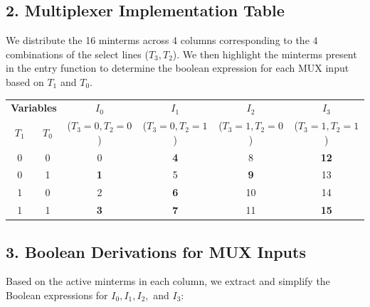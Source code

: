 \documentclass[12pt,a3paper]{article}
\begin{document}
\begin{enumerate}
\begin{tcolorbox}[enhanced,breakable,ansbox,colback=cD!4,colframe=cD,boxrule=0.8pt,arc=5pt,title={\textbf{Answer}},fonttitle=\bfseries\color{white},colbacktitle=cD]
\vspace{0.2cm}
\subsection*{2. Multiplexer Implementation Table}
We distribute the 16 minterms across 4 columns corresponding to the $4$ combinations of the select lines ($T_3, T_2$). We then highlight the minterms present in the entry function to determine the boolean expression for each MUX input based on $T_1$ and $T_0$.

\begin{center}
\renewcommand{\arraystretch}{1.3}
\begin{tabular}{c c | c | c | c | c}
\toprule
\multicolumn{2}{c|}{\textbf{Variables}} & \textbf{$I_0$} & \textbf{$I_1$} & \textbf{$I_2$} & \textbf{$I_3$} \\
$T_1$ & $T_0$ & ($T_3=0, T_2=0$) & ($T_3=0, T_2=1$) & ($T_3=1, T_2=0$) & ($T_3=1, T_2=1$) \\
\midrule
0 & 0 & 0 & \textcolor{cD}{\textbf{4}} & 8 & \textcolor{cD}{\textbf{12}} \\
0 & 1 & \textcolor{cD}{\textbf{1}} & 5 & \textcolor{cD}{\textbf{9}} & 13 \\
1 & 0 & 2 & \textcolor{cD}{\textbf{6}} & 10 & 14 \\
1 & 1 & \textcolor{cD}{\textbf{3}} & \textcolor{cD}{\textbf{7}} & 11 & \textcolor{cD}{\textbf{15}} \\
\bottomrule
\end{tabular}
\end{center}

\vspace{0.2cm}
\subsection*{3. Boolean Derivations for MUX Inputs}
Based on the active minterms in each column, we extract and simplify the Boolean expressions for $I_0, I_1, I_2,$ and $I_3$:


\end{tcolorbox}
\end{enumerate}
\end{document}
